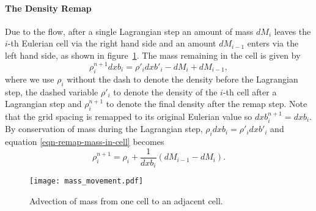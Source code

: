 \paragraph{The Density Remap}
Due to the flow, after a single Lagrangian step an amount of mass $dM_i$ leaves the $i$-th Eulerian cell via the right hand side and an amount $dM_{i-1}$ enters via the left hand side, as shown in figure~\ref{fig:mass_movement}. The mass remaining in the cell is given by
\begin{equation}
  \rho^{n+1}_i dxb_i = \rho'_i dxb'_i - dM_i + dM_{i-1},
  \label{eqn-remap-mass-in-cell}
\end{equation}
where we use $\rho_i$ without the dash to denote the density before the Lagrangian step, the dashed variable $\rho'_i$ to denote the density of the $i$-th cell after a Lagrangian step and $\rho_i^{n+1}$ to denote the final density after the remap step. Note that the grid spacing is remapped to its original Eulerian value so $dxb^{n+1}_i = dxb_i$. By conservation of mass during the Lagrangian step, $\rho_i dxb_i = \rho'_i dxb'_i$ and equation \eqref{eqn-remap-mass-in-cell} becomes
\begin{equation}
  \rho^{n+1}_i = \rho_i + \frac{1}{dxb_i} (dM_{i-1} - dM_i).
  \label{eqn-remap-density}
\end{equation}

\begin{figure}[t]
  \centering
  \texttt{[image: mass\_movement.pdf]}
  \caption{Advection of mass from one cell to an adjacent cell.}%
  \label{fig:mass_movement}
\end{figure}

